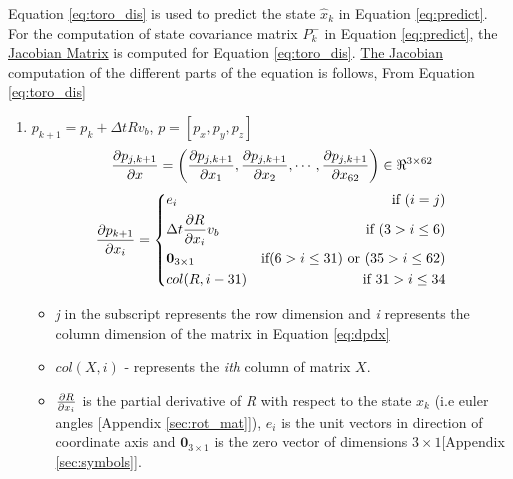 Equation \ref{eq:toro_dis} is used to predict the state $\hat{x}_k$ in Equation \ref{eq:predict}. For the computation of state covariance matrix $P_k^-$ in Equation \ref{eq:predict}, the \underline{Jacobian Matrix} is computed for Equation \ref{eq:toro_dis}. \underline{The Jacobian} computation of the different parts of the equation is follows,
From Equation \ref{eq:toro_dis}
\begin{enumerate}
\item $ p_{k+1} = p_k + \Delta t Rv_b$, $ p = [p_x,p_y,p_z]$
\begin{equation}
\label{eq:dpdx}
\frac{\partial {p_{j,k+1}}}{\partial {x}} = \left(\frac{\partial {p_{j,k+1}}}{\partial {x_{1}}}, \frac{\partial {p_{j,k+1}}}{\partial {x_{2}}}, \cdots , \frac{\partial {p_{j,k+1}}}{\partial {x_{62}}}\right) \in \Re^{3 \times 62}
\end{equation}
\[
 \frac{\partial {p_{k+1}}}{\partial {x_{i}}} =  \left\lbrace
  \!\begin{aligned}
   &e_i & \text{if }(i=j)\\
   &\Delta t \frac{\partial {R}}{\partial {x_i}}v_b & \text{if }(3 > i \leq 6)\\
   &\textbf{0}_{3 \times 1} &\text{if}(6 > i \leq 31) \text{ or } (35 > i \leq 62) \\
   &col(R,i-31) & \text{if } 31 > i \leq 34 \\
  \end{aligned} \right.
\]
\begin{itemize}
\item \emph{j} in the subscript represents the row dimension and  \emph{i} represents the column dimension of the matrix in Equation \ref{eq:dpdx}
\item $col(X,i)$ - represents the \emph{ith} column of matrix $X$.
\item $\frac{\partial {R}}{\partial {x_i}}$ is the partial derivative of \emph{R} with respect to the state $x_k$ (i.e euler angles [Appendix \ref{sec:rot_mat}]), $e_i$ is the unit vectors in direction of coordinate axis and  $\textbf{0}_{3 \times 1}$ is the zero vector of dimensions $3 \times 1$[Appendix \ref{sec:symbols}].
\end{itemize}


\end{enumerate}
